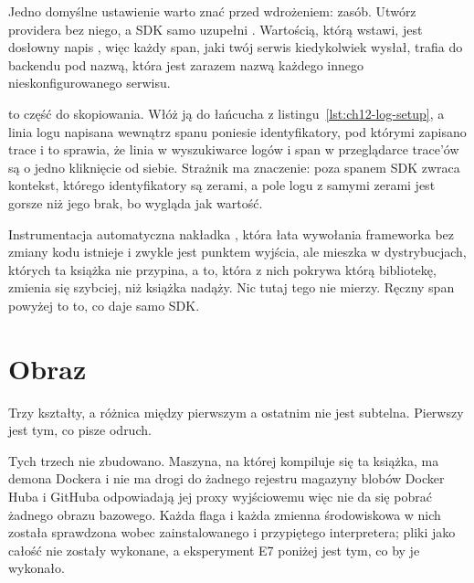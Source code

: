 \noindent
Jedno domyślne ustawienie warto znać przed wdrożeniem: zasób. Utwórz
providera bez niego, a SDK samo uzupełni . Wartością,
którą wstawi, jest dosłowny napis , więc każdy span,
jaki twój serwis kiedykolwiek wysłał, trafia do backendu pod nazwą, która
jest zarazem nazwą każdego innego nieskonfigurowanego serwisu.


\noindent
{} to część do skopiowania. Włóż ją do łańcucha z
listingu~\ref{lst:ch12-log-setup}, a linia logu napisana wewnątrz spanu
poniesie identyfikatory, pod którymi zapisano trace \dash{} i to sprawia, że
linia w wyszukiwarce logów i span w przeglądarce trace'ów są o jedno
kliknięcie od siebie. Strażnik  ma znaczenie: poza spanem SDK
zwraca kontekst, którego identyfikatory są zerami, a pole logu z samymi
zerami jest gorsze niż jego brak, bo wygląda jak wartość.

\begin{versionbox}
Instrumentacja automatyczna \dash{} nakładka ,
która łata wywołania frameworka bez zmiany kodu \dash{} istnieje i zwykle
jest punktem wyjścia, ale mieszka w dystrybucjach, których ta książka nie
przypina, a to, która z nich pokrywa którą bibliotekę, zmienia się szybciej,
niż książka nadąży. Nic tutaj tego nie mierzy. Ręczny span powyżej to to, co
daje samo SDK.
\end{versionbox}

\section{Obraz}
\label{sec:ch12-image}

Trzy kształty, a różnica między pierwszym a ostatnim nie jest subtelna.
Pierwszy jest tym, co pisze odruch.




\begin{verifybox}
Tych trzech nie zbudowano. Maszyna, na której kompiluje się ta książka, ma
demona Dockera i nie ma drogi do żadnego rejestru \dash{} magazyny blobów
Docker Huba i GitHuba odpowiadają jej proxy wyjściowemu  \dash{}
więc nie da się pobrać żadnego obrazu bazowego. Każda flaga i każda zmienna
środowiskowa w nich została sprawdzona wobec zainstalowanego  i
przypiętego interpretera; pliki jako całość nie zostały wykonane, a
eksperyment E7 poniżej jest tym, co by je wykonało.
\end{verifybox}

